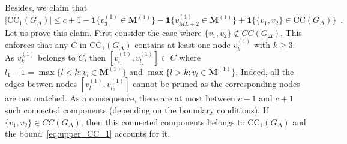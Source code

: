 \documentclass{article}
\begin{document}
Besides, we claim that
\begin{equation}\label{eq:upper_CC_1}
    |\mathrm{CC}_{1}(G_{\Delta})| \leq c + 1 - \mathbf{1}\{v^{(1)}_3\in \mathbf{M}^{(1)} \} - \mathbf{1}\{v^{(1)}_{ML+2}\in \mathbf{M}^{(1)} \}  + \mathbf{1}\{\{v_1,v_2\}\in \mathrm{CC}(G_{\Delta})\}\enspace . 
\end{equation}
Let us prove this claim.
First consider the case where $\{v_1,v_2\}\notin CC(G_{\Delta})$. This enforces that any $C$ in $\mathrm{CC}_{1}(G_{\Delta})$ contains at least one node $v_{k}^{(1)}$ with $k\geq 3$. As  $v^{(1)}_k$ belongs to $C$, then  $[v^{(1)}_{l_1},v^{(1)}_{l_2}]\subset C$ where $l_1-1= \max\{l <k : v_l\in \mathbf{M}^{(1)}\}$ and $\max\{l >k : v_l\in \mathbf{M}^{(1)}\}$. Indeed, all the edges betwen nodes $[v^{(1)}_{l_1},v^{(1)}_{l_2}]$ cannot be pruned as the corresponding nodes are not matched. As a consequence, there are at most between $c-1$ and $c+1$ such connected components (depending on the boundary conditions). %
If $\{v_1,v_2\}\in CC(G_{\Delta})$, then this connected components belongs to  $\mathrm{CC}_{1}(G_{\Delta})$ and the bound~\eqref{eq:upper_CC_1} accounts for it. 
\end{document}
